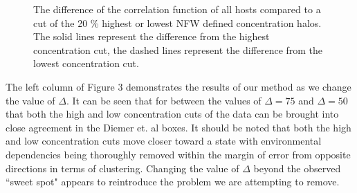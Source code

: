 \documentclass[usenatbib,usegraphicx,letterpaper]{mn2e}
\begin{document}
\begin{figure}
	\caption{The difference of the correlation function of all hosts compared to a cut of the 20 \% highest or lowest NFW defined concentration halos. The solid lines represent the difference from the highest concentration cut, the dashed lines represent the difference from the lowest concentration cut. }
\end{figure}


The left column of Figure 3 demonstrates the results of our method as we change the value of $\Delta$. It can be seen that for between the values of $\Delta = 75$ and $\Delta = 50$ that both the high and low concentration cuts of the data can be brought into close agreement in the Diemer et. al boxes. It should be noted that both the high and low concentration cuts move closer toward a state with environmental dependencies being thoroughly removed within the margin of error from opposite directions in terms of clustering. Changing the value of $\Delta$ beyond the observed ``sweet spot" appears to reintroduce the problem we are attempting to remove.
\end{document}
